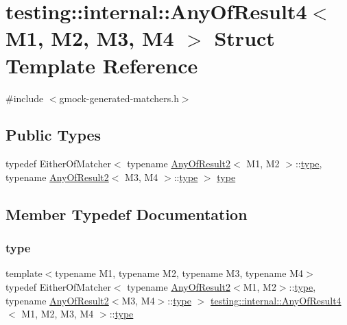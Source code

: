 \hypertarget{structtesting_1_1internal_1_1AnyOfResult4}{}\section{testing\+::internal\+::Any\+Of\+Result4$<$ M1, M2, M3, M4 $>$ Struct Template Reference}
\label{structtesting_1_1internal_1_1AnyOfResult4}


{\ttfamily \#include $<$gmock-\/generated-\/matchers.\+h$>$}

\subsection*{Public Types}
\begin{DoxyCompactItemize}
\item 
typedef Either\+Of\+Matcher$<$ typename \mbox{\hyperlink{structtesting_1_1internal_1_1AnyOfResult2}{Any\+Of\+Result2}}$<$ M1, M2 $>$\+::\mbox{\hyperlink{structtesting_1_1internal_1_1AnyOfResult4_a4f3c9aebb4f7fc24287b59a0bdf1a4a6}{type}}, typename \mbox{\hyperlink{structtesting_1_1internal_1_1AnyOfResult2}{Any\+Of\+Result2}}$<$ M3, M4 $>$\+::\mbox{\hyperlink{structtesting_1_1internal_1_1AnyOfResult4_a4f3c9aebb4f7fc24287b59a0bdf1a4a6}{type}} $>$ \mbox{\hyperlink{structtesting_1_1internal_1_1AnyOfResult4_a4f3c9aebb4f7fc24287b59a0bdf1a4a6}{type}}
\end{DoxyCompactItemize}


\subsection{Member Typedef Documentation}
\mbox{\label{structtesting_1_1internal_1_1AnyOfResult4_a4f3c9aebb4f7fc24287b59a0bdf1a4a6}} 
\subsubsection{\texorpdfstring{type}{type}}
{\footnotesize\ttfamily template$<$typename M1, typename M2, typename M3, typename M4$>$ \\
typedef Either\+Of\+Matcher$<$ typename \mbox{\hyperlink{structtesting_1_1internal_1_1AnyOfResult2}{Any\+Of\+Result2}}$<$M1, M2$>$\+::\mbox{\hyperlink{structtesting_1_1internal_1_1AnyOfResult4_a4f3c9aebb4f7fc24287b59a0bdf1a4a6}{type}}, typename \mbox{\hyperlink{structtesting_1_1internal_1_1AnyOfResult2}{Any\+Of\+Result2}}$<$M3, M4$>$\+::\mbox{\hyperlink{structtesting_1_1internal_1_1AnyOfResult4_a4f3c9aebb4f7fc24287b59a0bdf1a4a6}{type}} $>$ \mbox{\hyperlink{structtesting_1_1internal_1_1AnyOfResult4}{testing\+::internal\+::\+Any\+Of\+Result4}}$<$ M1, M2, M3, M4 $>$\+::\mbox{\hyperlink{structtesting_1_1internal_1_1AnyOfResult4_a4f3c9aebb4f7fc24287b59a0bdf1a4a6}{type}}}



